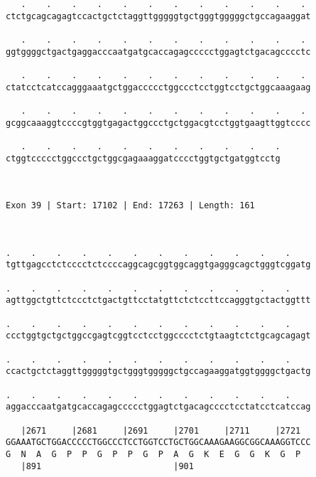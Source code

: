 \documentclass{article}
\begin{document}
\begin{Verbatim}
   .    .    .    .    .    .    .    .    .    .    .    . 
ctctgcagcagagtccactgctctaggttgggggtgctgggtgggggctgccagaaggat
                                                            
   .    .    .    .    .    .    .    .    .    .    .    . 
ggtggggctgactgaggacccaatgatgcaccagagccccctggagtctgacagcccctc
                                                            
   .    .    .    .    .    .    .    .    .    .    .    . 
ctatcctcatccagggaaatgctggaccccctggccctcctggtcctgctggcaaagaag
                                                            
   .    .    .    .    .    .    .    .    .    .    .    . 
gcggcaaaggtccccgtggtgagactggccctgctggacgtcctggtgaagttggtcccc
                                                            
   .    .    .    .    .    .    .    .    .    .    .
ctggtccccctggccctgctggcgagaaaggatcccctggtgctgatggtcctg
                                                      
                                                      
 
Exon 39 | Start: 17102 | End: 17263 | Length: 161



.    .    .    .    .    .    .    .    .    .    .    .    
tgttgagcctctcccctctccccaggcagcggtggcaggtgagggcagctgggtcggatg
                                                            
.    .    .    .    .    .    .    .    .    .    .    .    
agttggctgttctccctctgactgttcctatgttctctccttccagggtgctactggttt
                                                            
.    .    .    .    .    .    .    .    .    .    .    .    
ccctggtgctgctggccgagtcggtcctcctggcccctctgtaagtctctgcagcagagt
                                                            
.    .    .    .    .    .    .    .    .    .    .    .    
ccactgctctaggttgggggtgctgggtgggggctgccagaaggatggtggggctgactg
                                                            
.    .    .    .    .    .    .    .    .    .    .    .    
aggacccaatgatgcaccagagccccctggagtctgacagcccctcctatcctcatccag
                                                            
   |2671     |2681     |2691     |2701     |2711     |2721  
GGAAATGCTGGACCCCCTGGCCCTCCTGGTCCTGCTGGCAAAGAAGGCGGCAAAGGTCCC
G  N  A  G  P  P  G  P  P  G  P  A  G  K  E  G  G  K  G  P  
   |891                          |901                       
  

\end{Verbatim}
\end{document}
